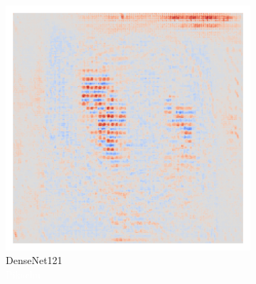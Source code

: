 \begin{figure}[H]
    \centering
     \\
    \begin{subfigure}{0.16\linewidth} %
        \centering
        \includegraphics[height=1\linewidth]{01-images/05-resultate/uap_densenet121/uap0-densenet121-mri_data-n200-robustificationslevel0.png}
        \caption{DenseNet121\\\textcolor{white}{Pikachu}}
        \label{fig:uap-densenet121-mri-prerobustification}
    \end{subfigure}\hfill%
    \begin{subfigure}{0.16\linewidth}
        \centering

\end{subfigure}
\end{figure}
